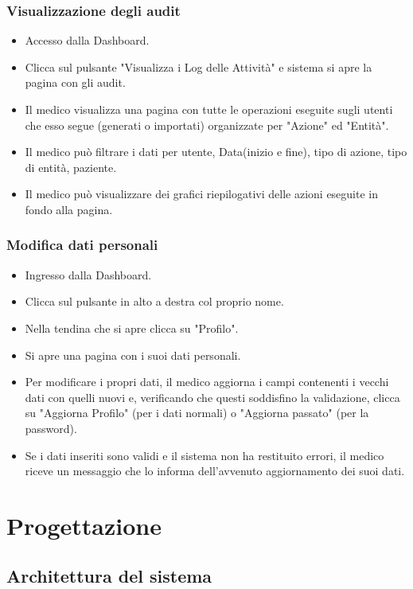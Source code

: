 \documentclass[12pt,a4paper,oneside]{report}
\begin{document}
\subsection{Visualizzazione degli audit}
\begin{itemize}
  \item Accesso dalla Dashboard.
    \item Clicca sul pulsante "Visualizza i Log delle Attività" e sistema si apre la pagina con gli audit.
    \item Il medico visualizza una pagina con tutte le operazioni eseguite sugli utenti che esso segue (generati o importati) organizzate per "Azione" ed "Entità".
    \item Il medico può filtrare i dati per utente, Data(inizio e fine), tipo di azione, tipo di entità, paziente.
    \item Il medico può visualizzare dei grafici riepilogativi delle azioni eseguite in fondo alla pagina.
\end{itemize}

\subsection{Modifica dati personali}
\begin{itemize}
  \item Ingresso dalla Dashboard.
    \item Clicca sul pulsante in alto a destra col proprio nome.
    \item Nella tendina che si apre clicca su "Profilo".
    \item Si apre una pagina con i suoi dati personali.
    \item Per modificare i propri dati, il medico aggiorna i campi contenenti i vecchi dati con quelli nuovi e, verificando che questi soddisfino la validazione, clicca su "Aggiorna Profilo" (per i dati normali) o "Aggiorna passato" (per la password).
    \item Se i dati inseriti sono validi e il sistema non ha restituito errori, il medico riceve un messaggio che lo informa dell'avvenuto aggiornamento dei suoi dati.
\end{itemize}

\chapter{Progettazione}
\section{Architettura del sistema}
\end{document}
